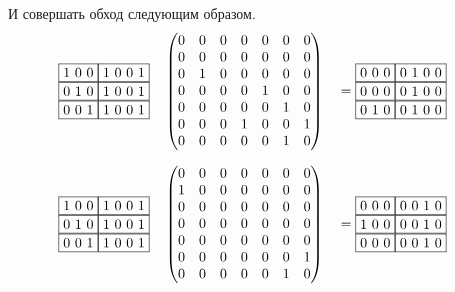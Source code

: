 \begin{example}
    И совершать обход следующим образом.
    \begin{alignat*}{7}
      & \begin{matrix}
        \fbox{1 0 0} \fbox{1 0 0 1} \\ 
        \fbox{0 1 0} \fbox{1 0 0 1} \\
        \fbox{0 0 1} \fbox{1 0 0 1}
          \end{matrix}  && \begin{pmatrix}
          0 & 0 & 0 & 0 & 0 & 0 & 0 \\
          0 & 0 & 0 & 0 & 0 & 0 & 0 \\
          0 & 1 & 0 & 0 & 0 & 0 & 0 \\
          0 & 0 & 0 & 0 & 1 & 0 & 0 \\
          0 & 0 & 0 & 0 & 0 & 1 & 0 \\
          0 & 0 & 0 & 1 & 0 & 0 & 1 \\
          0 & 0 & 0 & 0 & 0 & 1 & 0 
          \end{pmatrix} &&= \begin{matrix}
            \fbox{0 0 0} \fbox{0 1 0 0} \\ 
            \fbox{0 0 0} \fbox{0 1 0 0} \\
            \fbox{0 1 0} \fbox{0 1 0 0}
            \end{matrix}
      \end{alignat*}
    
    \begin{alignat*}{7}
      & \begin{matrix}
        \fbox{1 0 0} \fbox{1 0 0 1} \\ 
        \fbox{0 1 0} \fbox{1 0 0 1} \\
        \fbox{0 0 1} \fbox{1 0 0 1}
          \end{matrix}  && \begin{pmatrix}
          0 & 0 & 0 & 0 & 0 & 0 & 0 \\
          1 & 0 & 0 & 0 & 0 & 0 & 0 \\
          0 & 0 & 0 & 0 & 0 & 0 & 0 \\
          0 & 0 & 0 & 0 & 0 & 0 & 0 \\
          0 & 0 & 0 & 0 & 0 & 0 & 0 \\
          0 & 0 & 0 & 0 & 0 & 0 & 1 \\
          0 & 0 & 0 & 0 & 0 & 1 & 0 
          \end{pmatrix} &&= \begin{matrix}
            \fbox{0 0 0} \fbox{0 0 1 0} \\ 
            \fbox{1 0 0} \fbox{0 0 1 0} \\
            \fbox{0 0 0} \fbox{0 0 1 0}
            \end{matrix}
      \end{alignat*}
\end{example}

